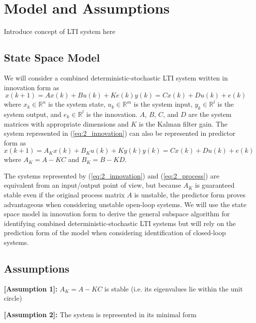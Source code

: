 \chapter{Model and Assumptions}
Introduce concept of LTI system here
\section{State Space Model}
We will consider a combined deterministic-stochastic LTI system written in innovation form as
\begin{subequations}\label{eq:2_innovation}
\begin{equation}x(k+1) = Ax(k) + Bu(k) + Ke(k)\end{equation}
\begin{equation}y(k) = Cx(k) + Du(k) + e(k)\end{equation}
\end{subequations}
where $x_k \in \mathbb{R}^n$ is the system state, $u_k \in \mathbb{R}^m$ is the system input, $y_k \in \mathbb{R}^l$ is the system output, and $e_k \in \mathbb{R}^l$ is the innovation. $A$, $B$, $C$, and $D$ are the system matrices with appropriate dimensions and $K$ is the Kalman filter gain. The system represented in (\ref{eq:2_innovation}) can also be represented in predictor form as
\begin{subequations}\label{eq:2_process}
\begin{equation}x(k+1) = A_Kx(k) + B_Ku(k) + Ky(k)\end{equation}
\begin{equation}y(k) = Cx(k) + Du(k) + e(k)\end{equation}
\end{subequations}
where $A_K = A-KC$ and $B_K = B-KD$.

The systems represented by (\ref{eq:2_innovation}) and (\ref{eq:2_process}) are equivalent from an input/output point of view, but because $A_K$ is guaranteed stable even if the original process matrix $A$ is unstable, the predictor form proves advantageous when considering unstable open-loop systems. We will use the state space model in innovation form to derive the general subspace algorithm for identifying combined deterministic-stochastic LTI systems but will rely on the prediction form of the model when considering identification of closed-loop systems.

\section{Assumptions}

\textbf{[Assumption 1]:} $A_K = A - KC$ is stable (i.e. its eigenvalues lie within the unit circle)

\noindent \textbf{[Assumption 2]:} The system is represented in its minimal form

